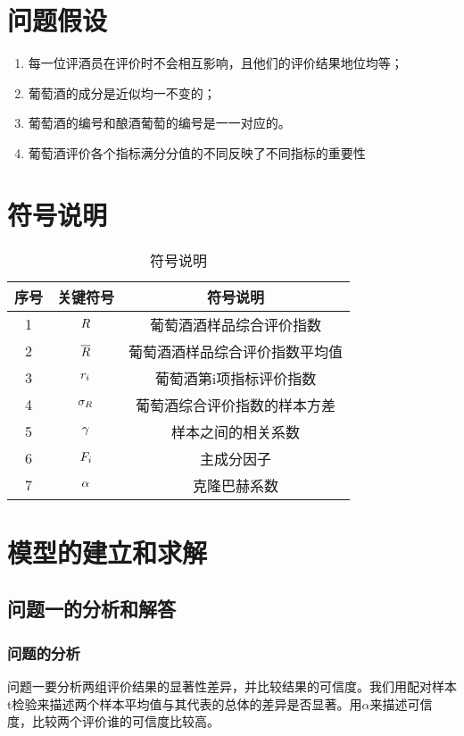 \documentclass[UTF8,12.05pt]{ctexart}
\begin{document}
\section{\heiti{}问题假设}
\begin{enumerate}
  \item 每一位评酒员在评价时不会相互影响，且他们的评价结果地位均等；
  \item 葡萄酒的成分是近似均一不变的；
  \item 葡萄酒的编号和酿酒葡萄的编号是一一对应的。
  \item 葡萄酒评价各个指标满分分值的不同反映了不同指标的重要性
\end{enumerate}
\section{\heiti{}符号说明}
\begin{table}[H]
  \centering
  \begin{tabular}{|c| c| c|}
  \hline
  序号&关键符号&符号说明 \\ \hline
  1&$\large R$&葡萄酒酒样品综合评价指数 \\
  2&$\large \overline{R}$&葡萄酒酒样品综合评价指数平均值 \\
  3&$\large r_{i}$&葡萄酒第i项指标评价指数 \\
  4&$\large \sigma_{R}$&葡萄酒综合评价指数的样本方差 \\
  5&$\large \gamma $&样本之间的相关系数 \\
  6&$\large F_{i}$&主成分因子\\
  7&$\large \alpha$&克隆巴赫系数\\ \hline
\end{tabular}
\caption{符号说明}
\end{table}

\section{\heiti{}模型的建立和求解}
\subsection{\heiti{}问题一的分析和解答}
\subsubsection{\heiti{}问题的分析}
问题一要分析两组评价结果的显著性差异，并比较结果的可信度。我们用配对样本t检验来描述两个样本平均值与其代表的总体的差异是否显著。用$\alpha$来描述可信度，比较两个评价谁的可信度比较高。
\end{document}
